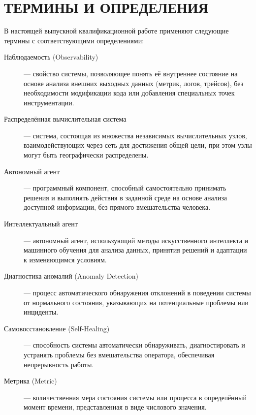 \chapter*{ТЕРМИНЫ И ОПРЕДЕЛЕНИЯ}

В настоящей выпускной квалификационной работе применяют следующие термины с соответствующими определениями:

\begin{sloppypar}
\begin{description}
    \item[Наблюдаемость (Observability)] — свойство системы, позволяющее понять её внутреннее состояние на основе анализа внешних выходных данных (метрик, логов, трейсов), без необходимости модификации кода или добавления специальных точек инструментации.
    
    \item[Распределённая вычислительная система] — система, состоящая из множества независимых вычислительных узлов, взаимодействующих через сеть для достижения общей цели, при этом узлы могут быть географически распределены.
    
    \item[Автономный агент] — программный компонент, способный самостоятельно принимать решения и выполнять действия в заданной среде на основе анализа доступной информации, без прямого вмешательства человека.
    
    \item[Интеллектуальный агент] — автономный агент, использующий методы искусственного интеллекта и машинного обучения для анализа данных, принятия решений и адаптации к изменяющимся условиям.
    
    \item[Диагностика аномалий (Anomaly Detection)] — процесс автоматического обнаружения отклонений в поведении системы от нормального состояния, указывающих на потенциальные проблемы или инциденты.
    
    \item[Самовосстановление (Self-Healing)] — способность системы автоматически обнаруживать, диагностировать и устранять проблемы без вмешательства оператора, обеспечивая непрерывность работы.
    
    \item[Метрика (Metric)] — количественная мера состояния системы или процесса в определённый момент времени, представленная в виде числового значения.
    

\end{description}
\end{sloppypar}

